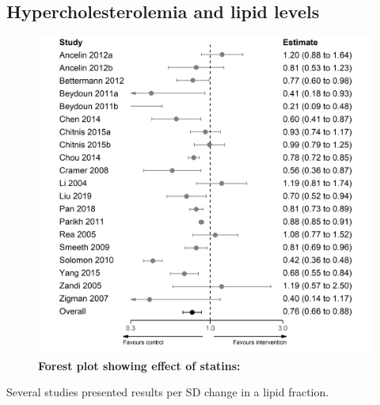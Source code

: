 \documentclass[a4paper, twoside]{templates/ociamthesis}
\begin{document}
~

\hypertarget{hypercholesterolemia-and-lipid-levels}{%
\subsection{Hypercholesterolemia and lipid levels}\label{hypercholesterolemia-and-lipid-levels}}





\begin{figure}[H]
\includegraphics[width=1\linewidth]{figures/sys-rev/forester_statins_any} \caption[Forest plot showing effect of statins]{\textbf{Forest plot showing effect of statins:}}\label{fig:hypercholNRSE}
\end{figure}

Several studies presented results per SD change in a lipid fraction.
\end{document}
